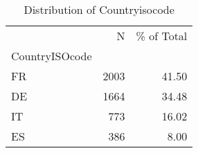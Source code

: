 \begin{table*}[htbp]
\centering
\small
\caption{Distribution of Countryisocode}
\label{tab:dist_countryisocode}
\begin{tabular}{lrr}
\toprule
 & N & \% of Total \\
CountryISOcode &  &  \\
\midrule
FR & 2003 & 41.50 \\
DE & 1664 & 34.48 \\
IT & 773 & 16.02 \\
ES & 386 & 8.00 \\
\bottomrule
\end{tabular}
\end{table*}

